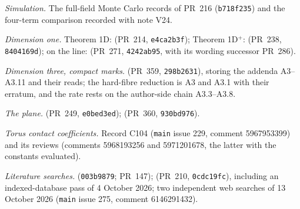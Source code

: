 {\begin{enumerate}[label={[R\arabic*]}, ref={R\arabic*}, leftmargin=3.2em, itemsep=2pt]
\item\label{rec:mc} \emph{Simulation.} The full-field Monte Carlo records of PR~216 (\texttt{b718f235}) and the four-term comparison recorded with note V24.
\item\label{rec:d1} \emph{Dimension one.} Theorem 1D:  (PR~214, \texttt{e4ca2b3f}); Theorem 1D$^+$:  (PR~238, \texttt{8404169d}); on the line:  (PR~271, \texttt{4242ab95}, with its wording successor PR~286).
\item\label{rec:qs3} \emph{Dimension three, compact marks.}  (PR~359, \texttt{298b2631}), storing the addenda A3--A3.11 and their reads; the hard-fibre reduction is A3 and A3.1 with their erratum, and the rate rests on the author-side chain A3.3--A3.8.
\item\label{rec:planar} \emph{The plane.}  (PR~249, \texttt{e0bed3ed});  (PR~360, \texttt{930bd976}).
\item\label{rec:c104} \emph{Torus contact coefficients.} Record C104 (\texttt{main} issue 229, comment 5967953399) and its reviews (comments 5968193256 and 5971201678, the latter with the constants evaluated).
\item\label{rec:lit} \emph{Literature searches.}  (\texttt{003b9879}; PR~147);  (PR~210, \texttt{0cdc19fc}), including an indexed-database pass of 4 October 2026; two independent web searches of 13 October 2026 (\texttt{main} issue 275, comment 6146291432).
\end{enumerate}
}
